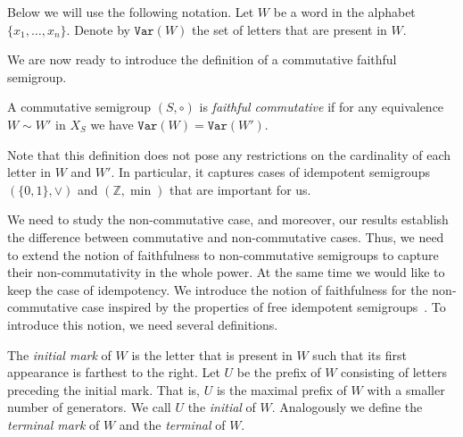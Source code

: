 \documentclass{toc}
\newcommand{\var}{\texttt{Var}}
\begin{document}
Below we will use the following notation. Let $W$ be a word in the alphabet
$\{x_1,\ldots, x_n\}$. Denote by $\var(W)$ the set of letters that are present
in $W$.

We are now ready to introduce the definition of a commutative faithful
semigroup.

\begin{definition}
A commutative semigroup $(S, \circ)$ is \emph{faithful commutative} if for any
equivalence $W\sim W'$ in $X_S$ we have $\var(W)=\var(W')$.
\end{definition}



Note that this definition does not pose any restrictions on the cardinality of
each letter in $W$ and $W'$. In particular, it captures cases of idempotent semigroups $(\{0,1\}, \vee)$ and $(\mathbb{Z},\min)$ that are important for us.



We need to study the non-commutative case, and moreover, our results
establish the difference between commutative and non-commutative cases. Thus,
we need to extend the notion of faithfulness to non-commutative semigroups to
capture their non-commutativity in the whole power. At the same time we would
like to keep the case of idempotency. We introduce the notion of faithfulness
for the non-commutative case inspired by the properties of free idempotent
semigroups~\cite{GreenR52}. To introduce this notion, we need several
definitions.


\begin{definition}
The \emph{initial mark} of $W$ is the letter that is present in $W$ such that
its first appearance is farthest to the right. Let $U$ be the prefix of $W$
consisting of letters preceding the initial mark. That is, $U$ is the maximal
prefix of $W$ with a smaller number of generators. We call $U$ the
\emph{initial} of $W$. Analogously we define the \emph{terminal mark} of $W$ and
the \emph{terminal} of $W$.
\end{definition}
\end{document}
